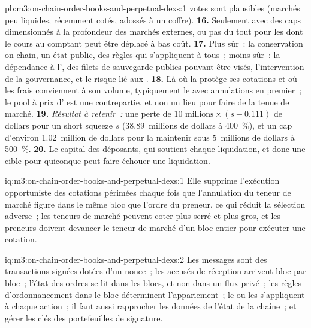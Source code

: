 \begin{solution}{pb:m3:on-chain-order-books-and-perpetual-dexs:1}
votes sont plausibles (marchés peu liquides, récemment cotés, adossés à un coffre). \textbf{16.} Seulement avec des caps dimensionnés à la profondeur des marchés externes, ou pas du tout
pour les  dont le cours au comptant peut être déplacé à bas coût. \textbf{17.} Plus sûr~: la conservation on-chain, un état public, des règles qui s'appliquent à tous~; moins sûr~:
la dépendance à l', des filets de sauvegarde publics pouvant être visés, l'intervention de la gouvernance, et le risque lié aux . \textbf{18.} Là où la  protège ses cotations et où les frais conviennent à son volume, typiquement le  avec annulations en premier~; le pool à prix d' est une
contrepartie, et non un lieu pour faire de la tenue de marché. \textbf{19.} \emph{Résultat à retenir~:} une perte de $10\text{ millions} \times (s - 0.111)$ de dollars pour un
short squeeze $s$ (38.89~millions de dollars à 400~\%), et un cap d'environ 1.02~million de dollars pour la maintenir sous 5~millions de dollars à 500~\%. \textbf{20.} Le capital des déposants,
qui soutient chaque liquidation, et donc une cible pour quiconque peut faire échouer une liquidation.
\end{solution}

\begin{solution}{iq:m3:on-chain-order-books-and-perpetual-dexs:1}
Elle supprime l'exécution opportuniste des cotations périmées chaque fois que l'annulation du teneur de marché figure dans le même bloc que l'ordre du preneur, ce qui réduit la sélection adverse~;
les teneurs de marché peuvent coter plus serré et plus gros, et les preneurs doivent devancer le teneur de marché d'un bloc entier pour exécuter une cotation.
\end{solution}

\begin{solution}{iq:m3:on-chain-order-books-and-perpetual-dexs:2}
Les messages sont des transactions signées dotées d'un nonce~; les accusés de réception arrivent bloc par bloc~; l'état des ordres se lit dans les blocs, et non dans un
flux privé~; les règles d'ordonnancement dans le bloc déterminent l'appariement~; le  ou les  s'appliquent à chaque action~; il faut aussi rapprocher les données de l'état de la chaîne~;
et gérer les clés des portefeuilles de signature.
\end{solution}

